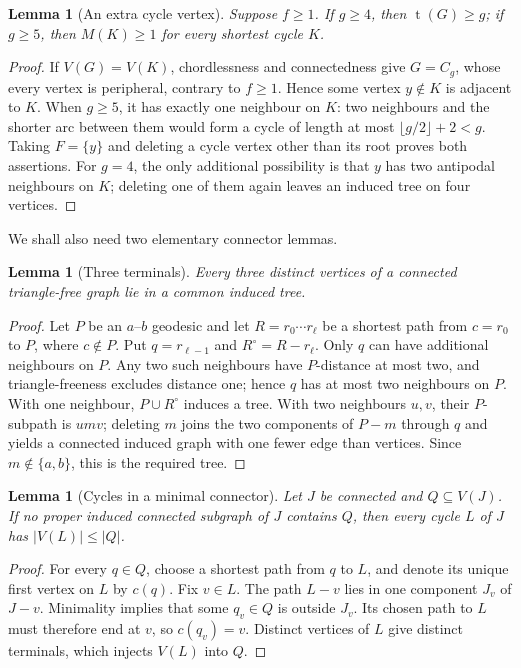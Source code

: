 \documentclass[11pt]{article}
\numberwithin{equation}{section}
\newtheorem{lemma}[theorem]{Lemma}
\theoremstyle{remark}
\newcommand{\tr}{\operatorname{t}}
\begin{document}
\begin{lemma}[An extra cycle vertex]\label{lem:extra}
Suppose $f\ge1$.  If $g\ge4$, then $\tr(G)\ge g$; if $g\ge5$, then
$M(K)\ge1$ for every shortest cycle $K$.
\end{lemma}

\begin{proof}
If $V(G)=V(K)$, chordlessness and connectedness give $G=C_g$, whose every
vertex is peripheral, contrary to $f\ge1$.  Hence some vertex $y\notin K$
is adjacent to $K$.  When $g\ge5$, it has exactly one neighbour on $K$:
two neighbours and the shorter arc between them would form a cycle of
length at most $\lfloor g/2\rfloor+2<g$.  Taking $F=\{y\}$ and deleting a
cycle vertex other than its root proves both assertions.  For $g=4$, the
only additional possibility is that $y$ has two antipodal neighbours on
$K$; deleting one of them again leaves an induced tree on four vertices.
\end{proof}

We shall also need two elementary connector lemmas.

\begin{lemma}[Three terminals]\label{lem:three-tree}
Every three distinct vertices of a connected triangle-free graph lie in a
common induced tree.
\end{lemma}

\begin{proof}
Let $P$ be an $a$--$b$ geodesic and let $R=r_0\cdots r_\ell$ be a shortest
path from $c=r_0$ to $P$, where $c\notin P$.  Put $q=r_{\ell-1}$ and
$R^\circ=R-r_\ell$.  Only $q$ can have additional neighbours on $P$.
Any two such neighbours have $P$-distance at most two, and triangle-freeness
excludes distance one; hence $q$ has at most two neighbours on $P$.
With one neighbour, $P\cup R^\circ$ induces a tree.  With two neighbours
$u,v$, their $P$-subpath is $u m v$; deleting $m$ joins the two components
of $P-m$ through $q$ and yields a connected induced graph with one fewer
edge than vertices.  Since $m\notin\{a,b\}$, this is the required tree.
\end{proof}

\begin{lemma}[Cycles in a minimal connector]\label{lem:minimal-connector}
Let $J$ be connected and $Q\subseteq V(J)$.  If no proper induced connected
subgraph of $J$ contains $Q$, then every cycle $L$ of $J$ has
$|V(L)|\le |Q|$.
\end{lemma}

\begin{proof}
For every $q\in Q$, choose a shortest path from $q$ to $L$, and denote its
unique first vertex on $L$ by $c(q)$.  Fix $v\in L$.  The path $L-v$ lies
in one component $J_v$ of $J-v$.  Minimality implies that some
$q_v\in Q$ is outside $J_v$.  Its chosen path to $L$ must therefore end at
$v$, so $c(q_v)=v$.  Distinct vertices of $L$ give distinct terminals,
which injects $V(L)$ into $Q$.
\end{proof}
\end{document}
